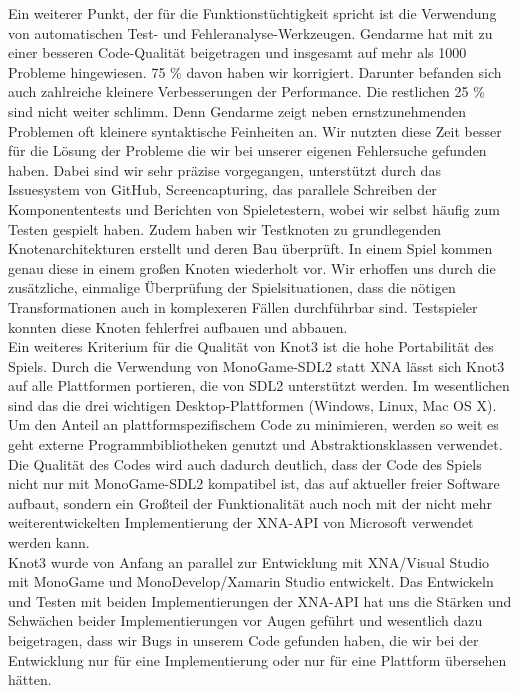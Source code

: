 Ein weiterer Punkt, der für die Funktionstüchtigkeit spricht ist die Verwendung von automatischen Test- und Fehleranalyse-Werkzeugen. Gendarme hat mit zu einer besseren Code-Qualität beigetragen und insgesamt auf mehr als 1000 Probleme hingewiesen. 75 \% davon haben wir korrigiert. Darunter befanden sich auch zahlreiche kleinere Verbesserungen der Performance. Die restlichen 25 \% sind nicht weiter schlimm. Denn Gendarme zeigt neben ernstzunehmenden Problemen oft kleinere syntaktische Feinheiten an. Wir nutzten diese Zeit besser für die Lösung der Probleme die wir bei unserer eigenen Fehlersuche gefunden haben. Dabei sind wir sehr präzise vorgegangen, unterstützt durch das Issuesystem von GitHub, Screencapturing, das parallele Schreiben der Komponententests und Berichten von Spieletestern, wobei wir selbst häufig zum Testen gespielt haben. Zudem haben wir Testknoten zu grundlegenden Knotenarchitekturen erstellt und deren Bau überprüft. In einem Spiel kommen genau diese in einem großen Knoten wiederholt vor. Wir erhoffen uns durch die zusätzliche, einmalige Überprüfung der Spielsituationen, dass die nötigen Transformationen auch in komplexeren Fällen durchführbar sind. Testspieler konnten diese Knoten fehlerfrei aufbauen und abbauen.\\

Ein weiteres Kriterium für die Qualität von Knot3 ist die hohe Portabilität des Spiels. Durch die Verwendung von MonoGame-SDL2 statt XNA lässt sich Knot3 auf alle Plattformen portieren, die von SDL2 unterstützt werden. Im wesentlichen sind das die drei wichtigen Desktop-Plattformen (Windows, Linux, Mac OS X).\\

Um den Anteil an plattformspezifischem Code zu minimieren, werden so weit es geht externe Programmbibliotheken genutzt und Abstraktionsklassen verwendet. Die Qualität des Codes wird auch dadurch deutlich, dass der Code des Spiels nicht nur mit MonoGame-SDL2 kompatibel ist, das auf aktueller freier Software aufbaut, sondern ein Großteil der Funktionalität auch noch mit der nicht mehr weiterentwickelten Implementierung der XNA-API von Microsoft verwendet werden kann.\\

Knot3 wurde von Anfang an parallel zur Entwicklung mit XNA/Visual Studio mit MonoGame und MonoDevelop/Xamarin Studio entwickelt. Das Entwickeln und Testen mit beiden Implementierungen der XNA-API hat uns die Stärken und Schwächen beider Implementierungen vor Augen geführt und wesentlich dazu beigetragen, dass wir Bugs in unserem Code gefunden haben, die wir bei der Entwicklung nur für eine Implementierung oder nur für eine Plattform übersehen hätten.\\

